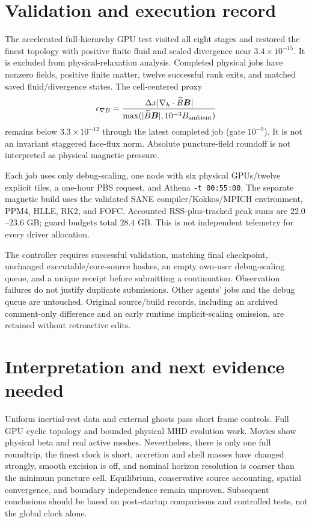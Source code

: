 \documentclass[twocolumn,anonymous]{aastex701}
\newcommand{\Btilde}{\widetilde{B}}
\begin{document}
\section{Validation and execution record}
The accelerated full-hierarchy GPU test visited all eight stages and restored the finest topology with positive finite fluid and scaled divergence near $3.4\times10^{-15}$. It is excluded from physical-relaxation analysis. Completed physical jobs have nonzero fields, positive finite matter, twelve successful rank exits, and matched saved fluid/divergence states. The cell-centered proxy
\begin{equation}
 \epsilon_{\nabla B}=\frac{\Delta x|\nabla_h\cdot\Btilde{\boldsymbol B}|}
 {\max(|\Btilde{\boldsymbol B}|,10^{-3}B_{\rm ambient})}
\end{equation}
remains below $3.3\times10^{-12}$ through the latest completed job (gate $10^{-9}$). It is not an invariant staggered face-flux norm. Absolute puncture-field roundoff is not interpreted as physical magnetic pressure.

Each job uses only debug-scaling, one node with six physical GPUs/twelve explicit tiles, a one-hour PBS request, and Athena \texttt{-t 00:55:00}. The separate magnetic build uses the validated SANE compiler/Kokkos/MPICH environment, PPM4, HLLE, RK2, and FOFC. Accounted RSS-plus-tracked peak sums are $22.0$--$23.6$ GB; guard budgets total $28.4$ GB. This is not independent telemetry for every driver allocation.

The controller requires successful validation, matching final checkpoint, unchanged executable/core-source hashes, an empty own-user debug-scaling queue, and a unique receipt before submitting a continuation. Observation failures do not justify duplicate submissions. Other agents' jobs and the debug queue are untouched. Original source/build records, including an archived comment-only difference and an early runtime implicit-scaling omission, are retained without retroactive edits.

\section{Interpretation and next evidence needed}
Uniform inertial-rest data and external ghosts pass short frame controls. Full GPU cyclic topology and bounded physical MHD evolution work. Movies show physical beta and real active meshes. Nevertheless, there is only one full roundtrip, the finest clock is short, accretion and shell masses have changed strongly, smooth excision is off, and nominal horizon resolution is coarser than the minimum puncture cell. Equilibrium, conservative source accounting, spatial convergence, and boundary independence remain unproven. Subsequent conclusions should be based on post-startup comparisons and controlled tests, not the global clock alone.
\end{document}
